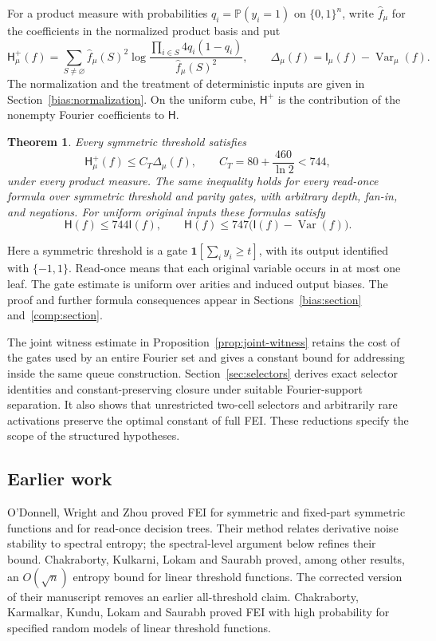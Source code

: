\documentclass[11pt]{amsart}
\newtheorem{mainthm}{Theorem}
\theoremstyle{definition}
\theoremstyle{remark}
\renewcommand{\P}{\mathbb P}
\newcommand{\HH}{\mathsf H}
\newcommand{\I}{\mathsf I}
\DeclareMathOperator{\Var}{Var}
\newcommand{\wh}[1]{\widehat{#1}}
\begin{document}
For a product measure with probabilities $q_i=\P(y_i=1)$ on $\{0,1\}^n$, write $\wh f_\mu$ for the coefficients in the normalized product basis and put
\[
 \HH_\mu^+(f)=\sum_{S\ne\varnothing}\wh f_\mu(S)^2
    \log\frac{\prod_{i\in S}4q_i(1-q_i)}{\wh f_\mu(S)^2},
 \qquad
 \Delta_\mu(f)=\I_\mu(f)-\Var_\mu(f).
\]
The normalization and the treatment of deterministic inputs are given in Section~\ref{bias:normalization}. On the uniform cube, $\HH^+$ is the contribution of the nonempty Fourier coefficients to $\HH$.

\begin{mainthm}\label{thm:formulas-intro}
Every symmetric threshold satisfies
\[
 \HH_\mu^+(f)\le C_T\Delta_\mu(f),
 \qquad C_T=80+\frac{460}{\ln2}<744,
\]
under every product measure. The same inequality holds for every read-once formula over symmetric threshold and parity gates, with arbitrary depth, fan-in, and negations. For uniform original inputs these formulas satisfy
\[
 \HH(f)\le744\I(f),\qquad
 \HH(f)\le747\bigl(\I(f)-\Var(f)\bigr).
\]
\end{mainthm}

Here a symmetric threshold is a gate $\mathbf1[\sum_i y_i\ge t]$, with its output identified with $\{-1,1\}$. Read-once means that each original variable occurs in at most one leaf. The gate estimate is uniform over arities and induced output biases. The proof and further formula consequences appear in Sections~\ref{bias:section} and~\ref{comp:section}.


The joint witness estimate in Proposition~\ref{prop:joint-witness}
retains the cost of the gates used by an entire Fourier set and gives a
constant bound for addressing inside the same queue construction.
Section~\ref{sec:selectors} derives exact selector identities and
constant-preserving closure under suitable Fourier-support separation.
It also shows that unrestricted two-cell selectors and arbitrarily
rare activations preserve the optimal constant of full FEI. These
reductions specify the scope of the structured hypotheses.

\subsection{Earlier work}

O'Donnell, Wright and Zhou \cite{OWZ11} proved FEI for symmetric and fixed-part symmetric functions and for read-once decision trees. Their method relates derivative noise stability to spectral entropy; the spectral-level argument below refines their bound. Chakraborty, Kulkarni, Lokam and Saurabh \cite{CKLS16} proved, among other results, an $O(\sqrt n)$ entropy bound for linear threshold functions. The corrected version of their manuscript removes an earlier all-threshold claim. Chakraborty, Karmalkar, Kundu, Lokam and Saurabh \cite{CKKLS18} proved FEI with high probability for specified random models of linear threshold functions.
\end{document}
